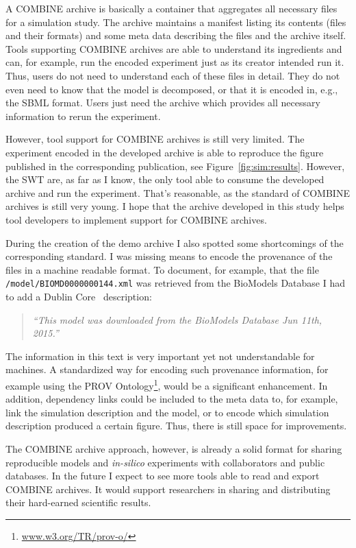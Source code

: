 A COMBINE archive is basically a container that aggregates all necessary files for a simulation study.
The archive maintains a manifest listing its contents (files and their formats) and some meta data describing the files and the archive itself.
Tools supporting COMBINE archives are able to understand its ingredients and can, for example, run the encoded experiment just as its creator intended run it.
Thus, users do not need to understand each of these files in detail.
They do not even need to know that the model is decomposed, or that it is encoded in, e.g., the SBML format.
Users just need the archive which provides all necessary information to rerun the experiment.

However, tool support for COMBINE archives is still very limited.
The experiment encoded in the developed archive is able to reproduce the figure published in the corresponding publication, see Figure~\ref{fig:sim:results}.
However, the SWT are, as far as I know, the only tool able to consume the developed archive and run the experiment.
That's reasonable, as the standard of COMBINE archives is still very young.
I hope that the archive developed in this study helps tool developers to implement support for COMBINE archives.

During the creation of the demo archive I also spotted some shortcomings of the corresponding standard.
I was missing means to encode the provenance of the files in a machine readable format.
To document, for example, that the file \texttt{/model/BIOMD0000000144.xml} was retrieved from the BioModels Database I had to add a Dublin Core~\cite{dc} description:
\begin{quote}
\textit{``This model was downloaded from the BioModels Database Jun 11th, 2015.''}
\end{quote}
The information in this text is very important yet not understandable for machines.
A standardized way for encoding such provenance information, for example using the PROV Ontology\footnote{\href{http://www.w3.org/TR/prov-o/}{www.w3.org/TR/prov-o/}}, would be a significant enhancement.
In addition, dependency links could be included to the meta data to, for example, link the simulation description and the model, or to encode which simulation description produced a certain figure.
Thus, there is still space for improvements.

The COMBINE archive approach, however, is already a solid format for sharing reproducible models and \textit{in-silico} experiments with collaborators and public databases.
In the future I expect to see more tools able to read and export COMBINE archives.
It would support researchers in sharing and distributing their hard-earned scientific results.


% 
% 
% 
% 
% 
% 
% 
% 

